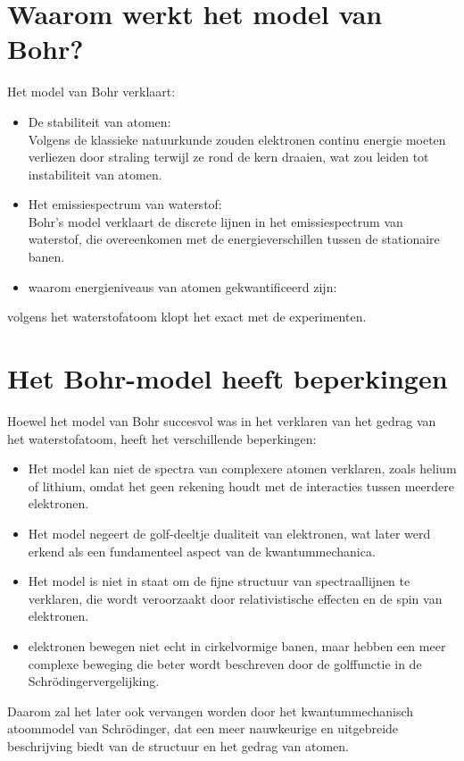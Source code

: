 \documentclass{report} %
\begin{document}
    \section{Waarom werkt het model van Bohr?}
    Het model van Bohr verklaart:
    \begin{itemize}
        \item De stabiliteit van atomen: \\
        Volgens de klassieke natuurkunde zouden elektronen continu energie moeten verliezen door straling terwijl ze rond de kern draaien, wat zou leiden tot instabiliteit van atomen.
        \item Het emissiespectrum van waterstof: \\
        Bohr's model verklaart de discrete lijnen in het emissiespectrum van waterstof, die overeenkomen met de energieverschillen tussen de stationaire banen.
        \item waarom energieniveaus van atomen gekwantificeerd zijn: \\
    \end{itemize}
    volgens het waterstofatoom klopt het exact met de experimenten.


    \section{Het Bohr-model heeft beperkingen}
    Hoewel het model van Bohr succesvol was in het verklaren van het gedrag van het waterstofatoom, heeft het verschillende beperkingen:
    \begin{itemize}
        \item Het model kan niet de spectra van complexere atomen verklaren, zoals helium of lithium, omdat het geen rekening houdt met de interacties tussen meerdere elektronen.
        \item Het model negeert de golf-deeltje dualiteit van elektronen, wat later werd erkend als een fundamenteel aspect van de kwantummechanica.
        \item Het model is niet in staat om de fijne structuur van spectraallijnen te verklaren, die wordt veroorzaakt door relativistische effecten en de spin van elektronen.
        \item elektronen bewegen niet echt in cirkelvormige banen, maar hebben een meer complexe beweging die beter wordt beschreven door de golffunctie in de Schrödingervergelijking.
    \end{itemize}
    Daarom zal het later ook vervangen worden door het kwantummechanisch atoommodel van Schrödinger, dat een meer nauwkeurige en uitgebreide beschrijving biedt van de structuur en het gedrag van atomen.
\end{document}
